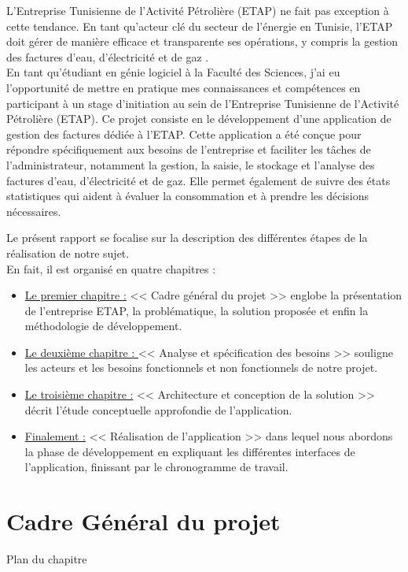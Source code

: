 \documentclass[12pt]{report}
\begin{document}
L'Entreprise Tunisienne de l'Activité Pétrolière (ETAP) ne fait pas exception à cette tendance. En tant qu'acteur clé du secteur de l'énergie en Tunisie, l'ETAP doit gérer de manière efficace et transparente ses opérations, y compris la gestion des factures d'eau, d'électricité et de gaz .\\

En tant qu'étudiant en génie logiciel à la Faculté des Sciences, j'ai eu l'opportunité de mettre en pratique mes connaissances et compétences en participant à un stage d'initiation au sein de l'Entreprise Tunisienne de l'Activité Pétrolière (ETAP). Ce projet consiste en le développement d'une application de gestion des factures dédiée à l'ETAP. Cette application a été conçue pour répondre spécifiquement aux besoins de l'entreprise et faciliter les tâches de l'administrateur, notamment la gestion, la saisie, le stockage et l'analyse des factures d'eau, d'électricité et de gaz. Elle permet également de suivre des états statistiques qui aident à évaluer la consommation et à prendre les décisions nécessaires.

Le présent rapport se focalise sur la description des différentes étapes de la réalisation de notre sujet. \\
En fait, il est organisé en quatre chapitres :
\begin{itemize}[label={$\rightarrow$}]
	\item \underline{Le premier chapitre :}  << Cadre général du projet >> englobe la présentation de l'entreprise ETAP, la problématique, la solution proposée et enfin la méthodologie de développement.
	\item \underline{Le deuxième chapitre : } << Analyse et spécification des besoins >> souligne les acteurs et les besoins fonctionnels et non fonctionnels de notre projet.
	\item \underline{Le troisième chapitre :} << Architecture et conception de la solution >> décrit l'étude conceptuelle approfondie de l'application.
	\item \underline{Finalement :} << Réalisation de l'application >> dans lequel nous abordons la phase de développement en expliquant les différentes interfaces de l'application, finissant par le chronogramme de travail.
\end{itemize}

\newpage

\chapter{Cadre Général du projet}
\vspace{100pt}
\begin{center}
Plan du chapitre
\end{center}
\end{document}
